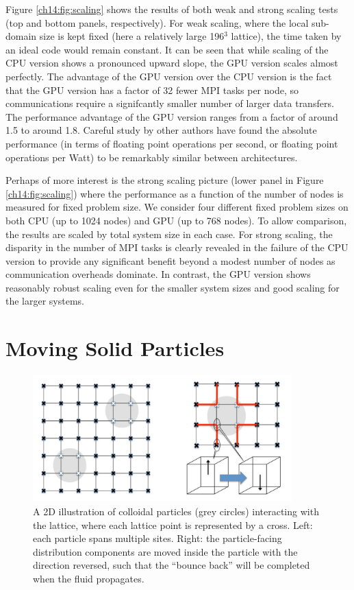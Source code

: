 Figure \ref{ch14:fig:scaling} shows the results of both weak and
strong scaling tests (top and bottom panels, respectively). For
weak scaling, where the local sub-domain size is kept fixed
(here a relatively large 196$^3$ lattice), the time taken by
an ideal code would remain constant. It can be seen that while
scaling of the CPU version shows a pronounced upward slope, the
GPU version scales almost perfectly. The advantage of the GPU
version over the CPU version is the fact that the GPU version
has a factor of 32 fewer MPI tasks per node, so communications
require a signifcantly smaller number of larger data transfers.
The performance
advantage of the GPU version ranges from a factor of around 1.5 to
around 1.8. Careful study by other authors \cite{williams2011} have
found the absolute performance (in terms of floating point
operations per second, or floating point operations per Watt) to
be remarkably similar between architectures.

Perhaps of more interest is the strong scaling picture (lower
panel in Figure \ref{ch14:fig:scaling}) where the performance
as a function of the number of nodes is measured for fixed problem
size. We consider four different fixed problem sizes on both CPU
(up to 1024 nodes) and GPU (up to 768 nodes). To allow comparison,
the results are scaled by total system size in each case. For strong
scaling, the disparity in the number of MPI tasks is clearly revealed
in the failure of the CPU version to provide any significant benefit
beyond a modest number of nodes as communication overheads dominate.
In contrast, the GPU version shows
reasonably robust scaling even for the smaller system sizes and good
scaling for the larger systems.

\section{Moving Solid Particles}\label{ch14:sec:particles}

\begin{figure}[t]
\centering
\includegraphics[width=10cm]{Chapters/chapter14/figures/bbl}
\caption{A 2D illustration of colloidal particles (grey circles)
  interacting with the lattice, where each lattice point is
  represented by a cross. Left: each particle spans multiple sites.
  Right: the particle-facing distribution components are moved inside
  the particle with the direction reversed, such that the ``bounce
  back'' will be completed when the fluid propagates.}
\label{ch14:fig:bbl}
\end{figure}


